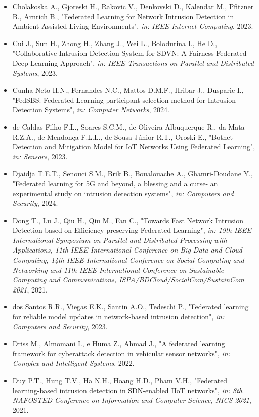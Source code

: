 \begin{itemize}
  \item Cholakoska A., Gjoreski H., Rakovic V., Denkovski D., Kalendar M., Pfitzner B., Arnrich B., "Federated Learning for Network Intrusion Detection in Ambient Assisted Living Environments", \textit{in: IEEE Internet Computing}, 2023.
  \item Cui J., Sun H., Zhong H., Zhang J., Wei L., Bolodurina I., He D., "Collaborative Intrusion Detection System for SDVN: A Fairness Federated Deep Learning Approach", \textit{in: IEEE Transactions on Parallel and Distributed Systems}, 2023.
  \item Cunha Neto H.N., Fernandes N.C., Mattos D.M.F., Hribar J., Dusparic I., "FedSBS: Federated-Learning participant-selection method for Intrusion Detection Systems", \textit{in: Computer Networks}, 2024.
  \item de Caldas Filho F.L., Soares S.C.M., de Oliveira Albuquerque R., da Mata R.Z.A., de Mendonça F.L.L., de Sousa Júnior R.T., Oroski E., "Botnet Detection and Mitigation Model for IoT Networks Using Federated Learning", \textit{in: Sensors}, 2023.
  \item Djaidja T.E.T., Senouci S.M., Brik B., Boualouache A., Ghamri-Doudane Y., "Federated learning for 5G and beyond, a blessing and a curse- an experimental study on intrusion detection systems", \textit{in: Computers and Security}, 2024.
  \item Dong T., Lu J., Qiu H., Qiu M., Fan C., "Towards Fast Network Intrusion Detection based on Efficiency-preserving Federated Learning", \textit{in: 19th IEEE International Symposium on Parallel and Distributed Processing with Applications, 11th IEEE International Conference on Big Data and Cloud Computing, 14th IEEE International Conference on Social Computing and Networking and 11th IEEE International Conference on Sustainable Computing and Communications, ISPA/BDCloud/SocialCom/SustainCom 2021}, 2021.
  \item dos Santos R.R., Viegas E.K., Santin A.O., Tedeschi P., "Federated learning for reliable model updates in network-based intrusion detection", \textit{in: Computers and Security}, 2023.
  \item Driss M., Almomani I., e Huma Z., Ahmad J., "A federated learning framework for cyberattack detection in vehicular sensor networks", \textit{in: Complex and Intelligent Systems}, 2022.
  \item Duy P.T., Hung T.V., Ha N.H., Hoang H.D., Pham V.H., "Federated learning-based intrusion detection in SDN-enabled IIoT networks", \textit{in: 8th NAFOSTED Conference on Information and Computer Science, NICS 2021}, 2021.

\end{itemize}
